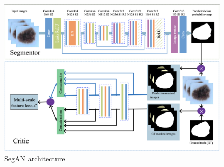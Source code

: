 \begin{figure}
    \centerline{\includegraphics[width=1\columnwidth]{04-methodology/figures/segan-architecture.png}}
    \caption{SegAN architecture}
    \label{fig:segan-architecture}
\end{figure}